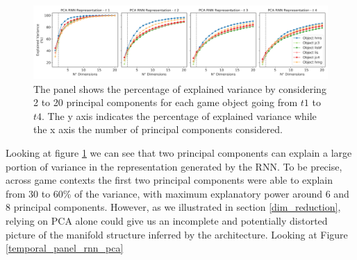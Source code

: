 \begin{figure}[!htb]
\centering
\includegraphics[width=\textwidth]{images/chapter_4/pca_embedding.png}
\caption[\textbf{Principal component analysis of the hidden units activation of the RNN architecture }]{The panel shows the percentage of explained variance by considering 2 to 20 principal components for each game object going from $t1$ to $t4$. The y axis indicates the percentage of explained variance while the x axis the number of principal components considered.}
\label{pca_emb} 
\end{figure}

Looking at figure \ref{pca_emb} we can see that two principal components can explain a large portion of variance in the representation generated by the RNN. To be precise, across game contexts the first two principal components were able to explain from 30 to 60\% of the variance, with maximum explanatory power around 6 and 8 principal components. However, as we illustrated in section \ref{dim_reduction}, relying on PCA alone could give us an incomplete and potentially distorted picture of the manifold structure inferred by the architecture. Looking at Figure \ref{temporal_panel_rnn_pca} 

